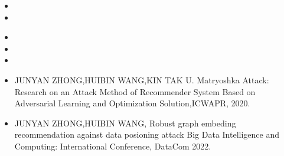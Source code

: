   \begin{itemize}[leftmargin=*]
    \item {}
    \item {}
    
  \end{itemize}
  \begin{itemize}[leftmargin=*]
    \item{}
    \item {}
    \item {}
     \item {JUNYAN ZHONG,HUIBIN WANG,KIN TAK U. Matryoshka Attack: Research on an Attack Method of Recommender System Based on Adversarial Learning and Optimization Solution,ICWAPR, 2020. } 
     \item{JUNYAN ZHONG,HUIBIN WANG, Robust graph embeding recommendation against data posioning attack Big Data Intelligence and Computing: International Conference, DataCom 2022.}
  \end{itemize}